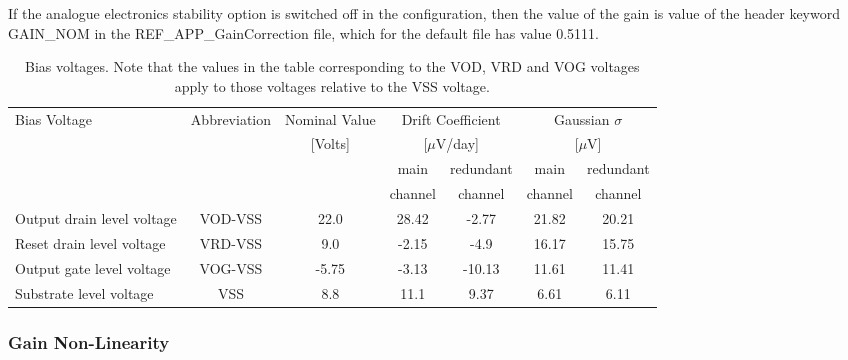 \documentclass[11pt]{article}      %
\def\HCode#1{}
\def\htmlanchor#1{\HCode{<a id="#1"></a>}}
\begin{document}
If the analogue electronics stability option is switched off in the configuration, then the value of the gain is value of the header keyword GAIN\_NOM in the  REF\_APP\_GainCorrection file, which for the default file has value 0.5111.

\begin{table}[hb]
  \begin{center}
  \caption{Bias voltages. Note that the values in the table corresponding to the VOD, VRD and VOG voltages apply to those voltages relative to the VSS voltage.}
  \begin{tabular}{| l | c | c | c | c | c | c |}
    \hline 
    Bias Voltage & Abbreviation & Nominal Value & \multicolumn{2}{|c|}{Drift Coefficient} & \multicolumn{2}{|c|}{Gaussian $\sigma$} \\
    & & [Volts] &\multicolumn{2}{|c|}{ [$\mu$V/day]} & \multicolumn{2}{|c|}{[$\mu$V]} \\
    \cline{4-7}
    & & & main & redundant & main & redundant \\
    & & & channel & channel & channel & channel \\
    \hline
Output drain level voltage & VOD-VSS & 22.0 & 28.42 & -2.77 & 21.82 & 20.21 \\
Reset drain level voltage & VRD-VSS & 9.0 & -2.15 & -4.9 & 16.17 & 15.75 \\
Output gate level voltage & VOG-VSS & -5.75 & -3.13 & -10.13 & 11.61 & 11.41 \\
Substrate level voltage & VSS & 8.8 & 11.1 & 9.37 & 6.61 & 6.11 \\
    \hline
  \end{tabular}
  \label{tab:voltages}
  \end{center}
\end{table}

\htmlanchor{ccdNonLinearity}
\subsubsection{Gain Non-Linearity}
\label{sec:nonlinearity}
\end{document}
